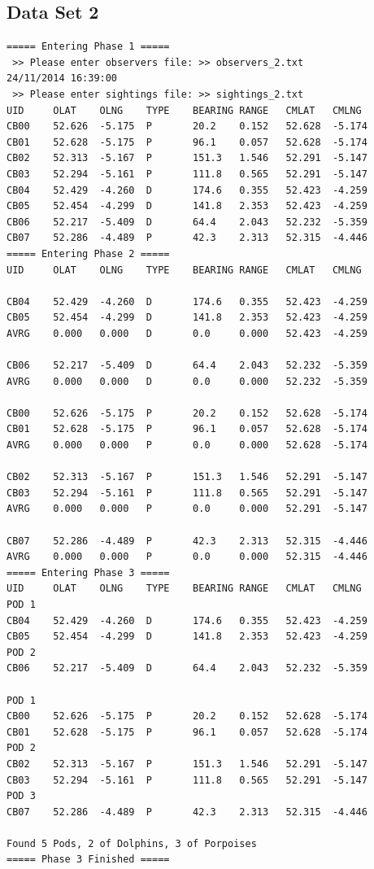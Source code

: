 \documentclass[10pt]{article}
\begin{document}
        \newpage
        \subsection{Data Set 2}
            \begin{verbatim}
===== Entering Phase 1 =====
 >> Please enter observers file: >> observers_2.txt
24/11/2014 16:39:00
 >> Please enter sightings file: >> sightings_2.txt
UID     OLAT    OLNG    TYPE    BEARING RANGE   CMLAT   CMLNG
CB00    52.626  -5.175  P       20.2    0.152   52.628  -5.174
CB01    52.628  -5.175  P       96.1    0.057   52.628  -5.174
CB02    52.313  -5.167  P       151.3   1.546   52.291  -5.147
CB03    52.294  -5.161  P       111.8   0.565   52.291  -5.147
CB04    52.429  -4.260  D       174.6   0.355   52.423  -4.259
CB05    52.454  -4.299  D       141.8   2.353   52.423  -4.259
CB06    52.217  -5.409  D       64.4    2.043   52.232  -5.359
CB07    52.286  -4.489  P       42.3    2.313   52.315  -4.446
===== Entering Phase 2 =====
UID     OLAT    OLNG    TYPE    BEARING RANGE   CMLAT   CMLNG

CB04    52.429  -4.260  D       174.6   0.355   52.423  -4.259
CB05    52.454  -4.299  D       141.8   2.353   52.423  -4.259
AVRG    0.000   0.000   D       0.0     0.000   52.423  -4.259

CB06    52.217  -5.409  D       64.4    2.043   52.232  -5.359
AVRG    0.000   0.000   D       0.0     0.000   52.232  -5.359

CB00    52.626  -5.175  P       20.2    0.152   52.628  -5.174
CB01    52.628  -5.175  P       96.1    0.057   52.628  -5.174
AVRG    0.000   0.000   P       0.0     0.000   52.628  -5.174

CB02    52.313  -5.167  P       151.3   1.546   52.291  -5.147
CB03    52.294  -5.161  P       111.8   0.565   52.291  -5.147
AVRG    0.000   0.000   P       0.0     0.000   52.291  -5.147

CB07    52.286  -4.489  P       42.3    2.313   52.315  -4.446
AVRG    0.000   0.000   P       0.0     0.000   52.315  -4.446
===== Entering Phase 3 =====
UID     OLAT    OLNG    TYPE    BEARING RANGE   CMLAT   CMLNG
POD 1
CB04    52.429  -4.260  D       174.6   0.355   52.423  -4.259
CB05    52.454  -4.299  D       141.8   2.353   52.423  -4.259
POD 2
CB06    52.217  -5.409  D       64.4    2.043   52.232  -5.359

POD 1
CB00    52.626  -5.175  P       20.2    0.152   52.628  -5.174
CB01    52.628  -5.175  P       96.1    0.057   52.628  -5.174
POD 2
CB02    52.313  -5.167  P       151.3   1.546   52.291  -5.147
CB03    52.294  -5.161  P       111.8   0.565   52.291  -5.147
POD 3
CB07    52.286  -4.489  P       42.3    2.313   52.315  -4.446

Found 5 Pods, 2 of Dolphins, 3 of Porpoises
===== Phase 3 Finished =====

            \end{verbatim}
\end{document}

